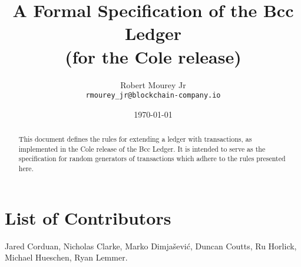 
\title{
  A Formal Specification of the Bcc Ledger\\
  \small{(for the Cole release)}
}

\author{Robert Mourey Jr \\
  {\small \texttt{rmourey_jr@blockchain-company.io}}\\
}

\date{\today}

\maketitle

\begin{abstract}
  This document defines the rules for extending a ledger with transactions, as
  implemented in the Cole release of the Bcc Ledger. It is intended to
  serve as the specification for random generators of transactions which adhere
  to the rules presented here.
\end{abstract}

\section*{List of Contributors}
\label{acknowledgements}

Jared Corduan, Nicholas Clarke, Marko Dimjašević, Duncan Coutts, Ru Horlick,
Michael Hueschen, Ryan Lemmer.
